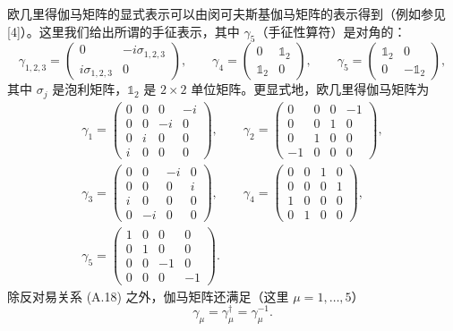 欧几里得伽马矩阵的显式表示可以由闵可夫斯基伽马矩阵的表示得到（例如参见 [4]）。这里我们给出所谓的手征表示，其中 $\gamma_5$（手征性算符）是对角的：
\begin{equation}
  \gamma_{1,2,3} = \begin{pmatrix} 0 & -i\sigma_{1,2,3} \\ i\sigma_{1,2,3} & 0 \end{pmatrix},\qquad
  \gamma_4 = \begin{pmatrix} 0 & \mathbb{1}_2 \\ \mathbb{1}_2 & 0 \end{pmatrix},\qquad
  \gamma_5 = \begin{pmatrix} \mathbb{1}_2 & 0 \\ 0 & -\mathbb{1}_2 \end{pmatrix},
\end{equation}
其中 $\sigma_j$ 是泡利矩阵，$\mathbb{1}_2$ 是 $2\times 2$ 单位矩阵。更显式地，欧几里得伽马矩阵为
\begin{equation}
  \begin{gathered}
    \gamma_1 = \begin{pmatrix} 0 & 0 & 0 & -i \\ 0 & 0 & -i & 0 \\ 0 & i & 0 & 0 \\ i & 0 & 0 & 0 \end{pmatrix},\qquad
    \gamma_2 = \begin{pmatrix} 0 & 0 & 0 & -1 \\ 0 & 0 & 1 & 0 \\ 0 & 1 & 0 & 0 \\ -1 & 0 & 0 & 0 \end{pmatrix},\\[4pt]
    \gamma_3 = \begin{pmatrix} 0 & 0 & -i & 0 \\ 0 & 0 & 0 & i \\ i & 0 & 0 & 0 \\ 0 & -i & 0 & 0 \end{pmatrix},\qquad
    \gamma_4 = \begin{pmatrix} 0 & 0 & 1 & 0 \\ 0 & 0 & 0 & 1 \\ 1 & 0 & 0 & 0 \\ 0 & 1 & 0 & 0 \end{pmatrix},\\[4pt]
    \gamma_5 = \begin{pmatrix} 1 & 0 & 0 & 0 \\ 0 & 1 & 0 & 0 \\ 0 & 0 & -1 & 0 \\ 0 & 0 & 0 & -1 \end{pmatrix}.
  \end{gathered}
\end{equation}
除反对易关系 (A.18) 之外，伽马矩阵还满足（这里 $\mu = 1, \ldots, 5$）
\begin{equation}
  \gamma_\mu = \gamma_\mu^\dagger = \gamma_\mu^{-1}.
\end{equation}

